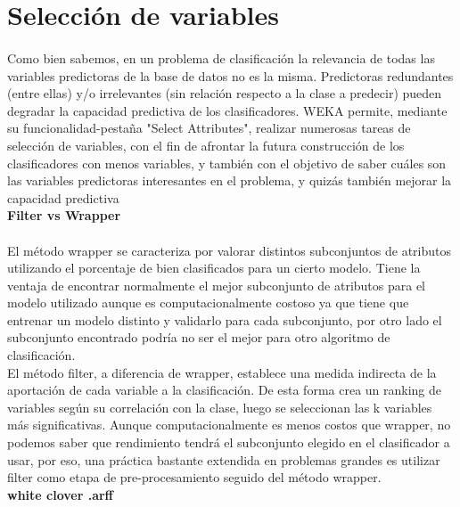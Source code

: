 \documentclass[es]{ifirak}
\begin{document}
\section{Selección de variables}
\paragraph{}
Como bien sabemos, en un problema de clasificación la relevancia de todas las variables predictoras de la base de datos no es la misma. Predictoras redundantes (entre ellas) y/o irrelevantes (sin relación respecto a la clase a predecir) pueden degradar la capacidad predictiva de los clasificadores. WEKA permite, mediante su funcionalidad-pestaña "Select Attributes", realizar numerosas tareas de selección de variables, con el fin de afrontar la futura construcción de los clasificadores con menos variables, y también con el objetivo de saber cuáles son las variables predictoras interesantes en el problema, y quizás también mejorar la capacidad predictiva\\

\textbf{Filter vs Wrapper}
\paragraph{}
El método wrapper se caracteriza por valorar distintos subconjuntos de atributos utilizando el porcentaje de bien clasificados para un cierto modelo. Tiene la ventaja de encontrar normalmente el mejor subconjunto de atributos para el modelo utilizado aunque es computacionalmente costoso ya que tiene que entrenar un modelo distinto y validarlo para cada subconjunto, por otro lado el subconjunto encontrado podría no ser el mejor para otro algoritmo de clasificación.\\

El método filter, a diferencia de wrapper, establece una medida indirecta de la aportación de cada variable a la clasificación. De esta forma crea un ranking de variables según su correlación con la clase, luego se seleccionan las k variables más significativas. Aunque computacionalmente es menos costos que wrapper, no podemos saber que rendimiento tendrá el subconjunto elegido en el clasificador a usar, por eso, una práctica bastante extendida en problemas grandes es utilizar filter como etapa de pre-procesamiento seguido del método wrapper.\\

\textbf{white clover .arff}\\
\end{document}
